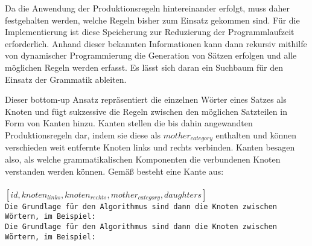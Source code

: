 \documentclass[12pt]{paper}
\begin{document}
Da die Anwendung der Produktionsregeln hintereinander erfolgt, muss daher festgehalten werden, welche Regeln bisher zum Einsatz gekommen sind. Für die Implementierung ist diese Speicherung zur Reduzierung der Programmlaufzeit erforderlich. Anhand dieser bekannten Informationen kann dann rekursiv mithilfe von dynamischer Programmierung die Generation von Sätzen erfolgen und alle möglichen Regeln werden erfasst. Es lässt sich daran ein Suchbaum für den Einsatz der Grammatik ableiten. 

Dieser bottom-up Ansatz repräsentiert die einzelnen Wörter eines Satzes als Knoten und fügt sukzessive die Regeln zwischen den möglichen Satzteilen in Form von Kanten hinzu. Kanten stellen die bis dahin angewandten Produktionsregeln dar, indem sie diese als \textit{$mother_{category}$} enthalten und können verschieden weit entfernte Knoten links und rechts verbinden. Kanten besagen also, als welche grammatikalischen Komponenten die verbundenen Knoten verstanden werden können. Gemäß \cite{cop04} besteht eine Kante aus:
\\
\tt
\\$[id, knoten_{links}, knoten_{rechts}, mother_{category}, daughters]$
\rm
\\

Die Grundlage für den Algorithmus sind dann die Knoten zwischen Wörtern, im Beispiel: \\
Die Grundlage für den Algorithmus sind dann die Knoten zwischen Wörtern, im Beispiel: 
\\
\end{document}
